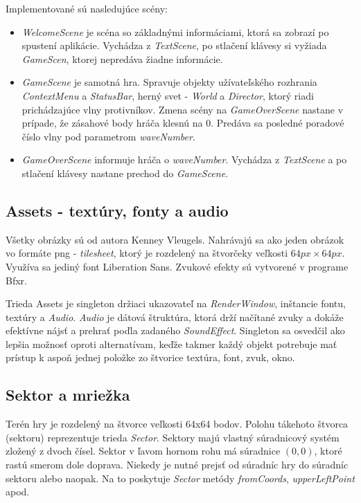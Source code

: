 \documentclass[12pt]{article}
\begin{document}
Implementované sú nasledujúce scény:
\begin{itemize}
    \item \emph{WelcomeScene} je scéna so základnými informáciami, ktorá sa zobrazí
    po spustení aplikácie. Vychádza z \emph{TextScene}, po stlačení klávesy si vyžiada
    \emph{GameScen}, ktorej nepredáva žiadne informácie.
    \item \emph{GameScene} je samotná hra. Spravuje objekty užívateľského rozhrania
    \emph{ContextMenu} a \emph{StatusBar}, herný svet - \emph{World} a \emph{Director},
    ktorý riadi prichádzajúce vlny protivníkov. Zmena scény na \emph{GameOverScene} nastane
    v prípade, že zásahové body hráča klesnú na 0. Predáva sa posledné poradové
    číslo vlny pod parametrom \emph{waveNumber}.
    \item \emph{GameOverScene} informuje hráča o \emph{waveNumber}. Vychádza z \emph{TextScene}
    a po stlačení klávesy nastane prechod do \emph{GameScene}.
\end{itemize}


\subsection{Assets - textúry, fonty a audio}

Všetky obrázky sú od autora Kenney Vleugels. Nahrávajú sa ako jeden obrázok vo formáte png - \emph{tilesheet},
ktorý je rozdelený na štvorčeky veľkosti $64px\times64px$. Využíva sa jediný font Liberation Sans.
Zvukové efekty sú vytvorené v programe Bfxr.


Trieda Assets je singleton držiaci ukazovateľ na \emph{RenderWindow}, inštancie fontu, textúry a \emph{Audio}.
\emph{Audio} je dátová štruktúra, ktorá drží načítané zvuky a dokáže efektívne nájsť a prehrať poďla zadaného 
\emph{SoundEffect}. Singleton sa osvedčil ako lepšia možnosť oproti alternatívam, keďže takmer každý objekt potrebuje
mať prístup k aspoň jednej položke zo štvorice textúra, font, zvuk, okno.

\subsection{Sektor a mriežka}

Terén hry je rozdelený na štvorce veľkosti 64x64 bodov. Polohu tákehoto štvorca (sektoru) reprezentuje trieda
\emph{Sector}. Sektory majú vlastný súradnicový systém zložený z dvoch čísel. Sektor v ľavom hornom rohu má súradnice
$(0, 0)$, ktoré rastú smerom dole doprava. Niekedy je nutné prejsť od súradníc hry do súradníc sektoru alebo naopak.
Na to poskytuje \emph{Sector} metódy \emph{fromCoords}, \emph{upperLeftPoint} apod.
\end{document}
